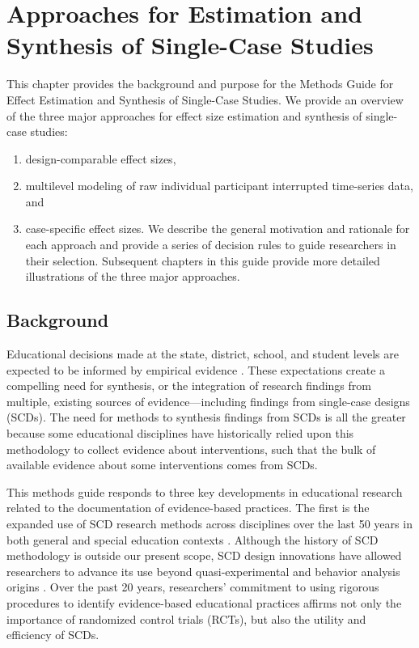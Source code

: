 \documentclass[
]{book}
\providecommand{\tightlist}{%
  \setlength{\itemsep}{0pt}\setlength{\parskip}{0pt}}
\begin{document}
\hypertarget{intro}{%
\chapter{Approaches for Estimation and Synthesis of Single-Case Studies}\label{intro}}

This chapter provides the background and purpose for the Methods Guide for Effect Estimation and Synthesis of Single-Case Studies.
We provide an overview of the three major approaches for effect size estimation and synthesis of single-case studies:

\begin{enumerate}
\def\labelenumi{(\alph{enumi})}
\tightlist
\item
  design-comparable effect sizes,
\item
  multilevel modeling of raw individual participant interrupted time-series data, and
\item
  case-specific effect sizes.
  We describe the general motivation and rationale for each approach and provide a series of decision rules to guide researchers in their selection.
  Subsequent chapters in this guide provide more detailed illustrations of the three major approaches.
\end{enumerate}

\hypertarget{background}{%
\section{Background}\label{background}}

Educational decisions made at the state, district, school, and student levels are expected to be informed by empirical evidence \citep{cook2014council, whatworksclearinghouse2020What}.
These expectations create a compelling need for synthesis, or the integration of research findings from multiple, existing sources of evidence---including findings from single-case designs (SCDs).
The need for methods to synthesis findings from SCDs is all the greater because some educational disciplines have historically relied upon this methodology to collect evidence about interventions, such that the bulk of available evidence about some interventions comes from SCDs.

This methods guide responds to three key developments in educational research related to the documentation of evidence-based practices.
The first is the expanded use of SCD research methods across disciplines over the last 50 years in both general and special education contexts \citep{Kratochwill2014Visual}.
Although the history of SCD methodology is outside our present scope, SCD design innovations have allowed researchers to advance its use beyond quasi-experimental and behavior analysis origins \citep[see][ for more detailed information on the history of SCD]{Kratochwill2014Visual}.
Over the past 20 years, researchers' commitment to using rigorous procedures to identify evidence-based educational practices affirms not only the importance of randomized control trials (RCTs), but also the utility and efficiency of SCDs.
\end{document}
